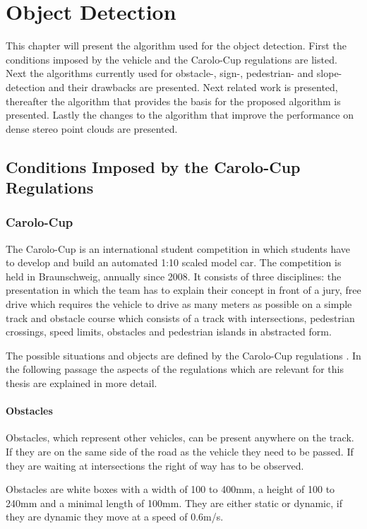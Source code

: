 \chapter{Object Detection} \label{sec:det}
This chapter will present the algorithm used for the object detection. First the conditions imposed by the vehicle and the Carolo-Cup regulations are listed. Next the algorithms currently used for obstacle-, sign-, pedestrian- and slope-detection and their drawbacks are presented. 
Next related work is presented, thereafter the algorithm that provides the basis for the proposed algorithm is presented. Lastly the changes to the algorithm that improve the performance on dense stereo point clouds are presented.

\section{Conditions Imposed by the Carolo-Cup Regulations}

\subsection{Carolo-Cup} \label{sec:det:ccr}
The Carolo-Cup is an international student competition in which students have to develop and build an automated 1:10 scaled model car.
The competition is held in Braunschweig, annually since 2008. It consists of three disciplines: the presentation in which the team has to explain their concept in front of a jury, free drive which requires the vehicle to drive as many meters as possible on a simple track and obstacle course which consists of a track with intersections, pedestrian crossings, speed limits, obstacles and pedestrian islands in abstracted form.

The possible situations and objects are defined by the Carolo-Cup regulations \cite{Carolo-CupRegelwerk}. 
In the following passage the aspects of the regulations which are relevant for this thesis are explained in more detail.

\subsubsection{Obstacles}
Obstacles, which represent other vehicles, can be present anywhere on the track. 
If they are on the same side of the road as the vehicle they need to be passed. If they are waiting at intersections the right of way has to be observed.

Obstacles are white boxes with a width of 100 to 400mm, a height of 100 to 240mm and a minimal length of 100mm. They are either static or dynamic, if they are dynamic they move at a speed of 0.6m/s.

